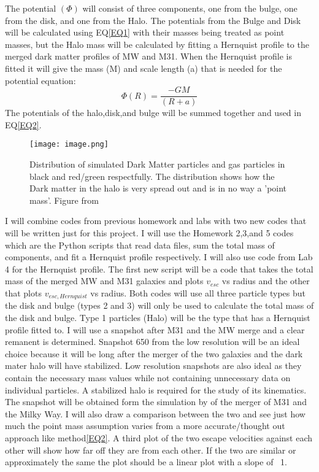 \documentclass[fleqn,usenatbib]{mnras}
\begin{document}
The potential $(\Phi)$ will consist of three components, one from the bulge, one from the disk, and one from the Halo. The potentials from the Bulge and Disk will be calculated using EQ\ref{EQ1} with their masses being treated as point masses, but the Halo mass will be calculated by fitting a Hernquist profile to the merged dark matter profiles of MW and M31. When the Hernquist profile is fitted it will give the mass (M) and scale length (a) that is needed for the potential equation:
\begin{equation}
    \Phi(R) = \frac{-GM}{(R+a)}
    \label{EQ3}
\end{equation}
The potentials of the halo,disk,and bulge will be summed together and used in EQ\ref{EQ2}.

\begin{figure}
	\texttt{[image: image.png]}
    \caption{Distribution of simulated Dark Matter particles and gas particles in black and red/green respectfully. The distribution shows how the Dark matter in the halo is very spread out and is in no way a 'point mass'. Figure from \cite{Abadi2010MNRAS} }
    \label{fig:fig 2}
\end{figure}
I will combine codes from previous homework and labs with two new codes that will be written just for this project. I will use the Homework 2,3,and 5 codes which are the Python scripts that read data files, sum the total mass of components, and fit a Hernquist profile respectively. I will also use code from Lab 4 for the Hernquist profile. The first new script will be a code that takes the total mass of the merged MW and M31 galaxies and plots $v_{esc}$ vs radius and the other that plots $v_{esc,Hernquist}$ vs radius. Both codes will use all three particle types but the disk and bulge (types 2 and 3) will only be used to calculate the total mass of the disk and bulge. Type 1 particles (Halo) will be the type that has a Hernquist profile fitted to. I will use a snapshot after M31 and the MW merge and a clear remanent is determined. Snapshot 650 from the low resolution will be an ideal choice because it will be long after the merger of the two galaxies and the dark mater halo will have stabilized. Low resolution snapshots are also ideal as they contain the necessary mass values while not containing unnecessary data on individual particles. A stabilized halo is required for the study of its kinematics. The snapshot will be obtained form the simulation by \citep[][]{vanderMarel2012ApJ} of the merger of M31 and the Milky Way. 
I will also draw a comparison between the two and see just how much the point mass assumption varies from a more accurate/thought out approach like method\ref{EQ2}. A third plot of the two escape velocities against each other will show how far off they are from each other. If the two are similar or approximately the same the plot should be a linear plot with a slope of ~1.   
\end{document}
